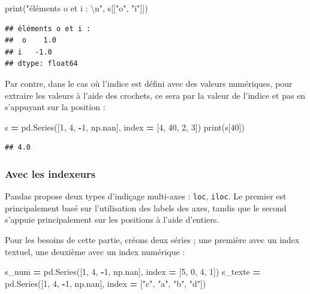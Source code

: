 \documentclass[
  12pt,
]{book}
\newenvironment{Shaded}{\begin{snugshade}}{\end{snugshade}}
\newcommand{\BuiltInTok}[1]{#1}
\newcommand{\CharTok}[1]{\textcolor[rgb]{0.31,0.60,0.02}{#1}}
\newcommand{\DecValTok}[1]{\textcolor[rgb]{0.00,0.00,0.81}{#1}}
\newcommand{\NormalTok}[1]{#1}
\newcommand{\OperatorTok}[1]{\textcolor[rgb]{0.81,0.36,0.00}{\textbf{#1}}}
\newcommand{\StringTok}[1]{\textcolor[rgb]{0.31,0.60,0.02}{#1}}
\numberwithin{equation}{section}
\numberwithin{countremarque}{section}
\begin{document}
\begin{Shaded}
\begin{Highlighting}[]
\BuiltInTok{print}\NormalTok{(}\StringTok{"éléments o et i : }\CharTok{\textbackslash{}n}\StringTok{"}\NormalTok{, s[[}\StringTok{"o"}\NormalTok{, }\StringTok{"i"}\NormalTok{]])}
\end{Highlighting}
\end{Shaded}

\begin{lstlisting}
## éléments o et i : 
##  o    1.0
## i   -1.0
## dtype: float64
\end{lstlisting}

Par contre, dans le cas où l'indice est défini avec des valeurs numériques, pour extraire les valeurs à l'aide des crochets, ce sera par la valeur de l'indice et pas en s'appuyant sur la position :

\begin{Shaded}
\begin{Highlighting}[]
\NormalTok{s }\OperatorTok{=}\NormalTok{ pd.Series([}\DecValTok{1}\NormalTok{, }\DecValTok{4}\NormalTok{, }\OperatorTok{{-}}\DecValTok{1}\NormalTok{, np.nan],}
\NormalTok{             index }\OperatorTok{=}\NormalTok{ [}\DecValTok{4}\NormalTok{, }\DecValTok{40}\NormalTok{, }\DecValTok{2}\NormalTok{, }\DecValTok{3}\NormalTok{])}
\BuiltInTok{print}\NormalTok{(s[}\DecValTok{40}\NormalTok{])}
\end{Highlighting}
\end{Shaded}

\begin{lstlisting}
## 4.0
\end{lstlisting}

\subsubsection{Avec les indexeurs}\label{avec-les-indexeurs}

Pandas propose deux types d'indiçage multi-axes : \texttt{loc}, \texttt{iloc}. Le premier est principalement basé sur l'utilisation des labels des axes, tandis que le second s'appuie principalement sur les positions à l'aide d'entiers.

Pour les besoins de cette partie, créons deux séries ; une première avec un index textuel, une deuxième avec un index numérique :

\begin{Shaded}
\begin{Highlighting}[]
\NormalTok{s\_num }\OperatorTok{=}\NormalTok{ pd.Series([}\DecValTok{1}\NormalTok{, }\DecValTok{4}\NormalTok{, }\OperatorTok{{-}}\DecValTok{1}\NormalTok{, np.nan],}
\NormalTok{             index }\OperatorTok{=}\NormalTok{ [}\DecValTok{5}\NormalTok{, }\DecValTok{0}\NormalTok{, }\DecValTok{4}\NormalTok{, }\DecValTok{1}\NormalTok{])}
\NormalTok{s\_texte }\OperatorTok{=}\NormalTok{ pd.Series([}\DecValTok{1}\NormalTok{, }\DecValTok{4}\NormalTok{, }\OperatorTok{{-}}\DecValTok{1}\NormalTok{, np.nan],}
\NormalTok{             index }\OperatorTok{=}\NormalTok{ [}\StringTok{"c"}\NormalTok{, }\StringTok{"a"}\NormalTok{, }\StringTok{"b"}\NormalTok{, }\StringTok{"d"}\NormalTok{])}
\end{Highlighting}
\end{Shaded}
\end{document}
